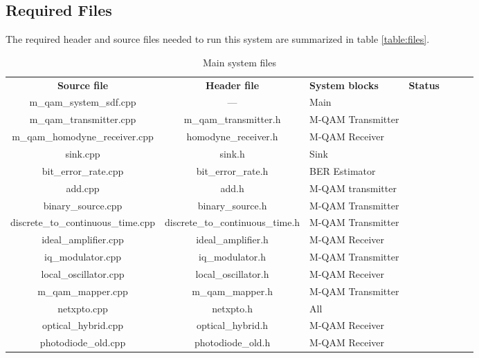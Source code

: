 \subsection*{Required Files}

The required header and source files needed to run this system are summarized in table \ref{table:files}.

\begin{table}[]
	\centering
	\caption{Main system files}
	\begin{tabular}{|c|c|p{35mm}|c|ccc}
		\cline{1-4}
		\textbf{Source file} & \textbf{Header file}  &  \textbf{System blocks} & \textbf{Status} & \\ \cline{1-4}
		m\_qam\_system\_sdf.cpp & --- & Main &\checkmark & \\ \cline{1-4}
		m\_qam\_transmitter.cpp & m\_qam\_transmitter.h & M-QAM Transmitter & \checkmark &  \\ \cline{1-4}
		m\_qam\_homodyne\_receiver.cpp & homodyne\_receiver.h & M-QAM Receiver & \checkmark &  \\ \cline{1-4}
		sink.cpp & sink.h & Sink & \checkmark & \\ \cline{1-4}
		bit\_error\_rate.cpp & bit\_error\_rate.h & BER Estimator & \checkmark &\\ \cline{1-4}
		add.cpp & add.h & M-QAM transmitter & \checkmark & \\ \cline{1-4}
		binary\_source.cpp & binary\_source.h & M-QAM Transmitter & \checkmark & \\ \cline{1-4}
		discrete\_to\_continuous\_time.cpp & discrete\_to\_continuous\_time.h & M-QAM Transmitter & \checkmark & \\ \cline{1-4}
		ideal\_amplifier.cpp & ideal\_amplifier.h & M-QAM Receiver & \checkmark & \\ \cline{1-4}
		iq\_modulator.cpp & iq\_modulator.h & M-QAM Transmitter & \checkmark & \\ \cline{1-4}
		local\_oscillator.cpp & local\_oscillator.h & M-QAM Receiver & \checkmark & \\ \cline{1-4}
		m\_qam\_mapper.cpp & m\_qam\_mapper.h & M-QAM Transmitter & \checkmark & \\ \cline{1-4}
		netxpto.cpp & netxpto.h & All & \checkmark & \\ \cline{1-4}
		optical\_hybrid.cpp & optical\_hybrid.h & M-QAM Receiver & \checkmark & \\ \cline{1-4}
		photodiode\_old.cpp & photodiode\_old.h & M-QAM Receiver & \checkmark & \\ \cline{1-4}

\end{tabular}
\end{table}

